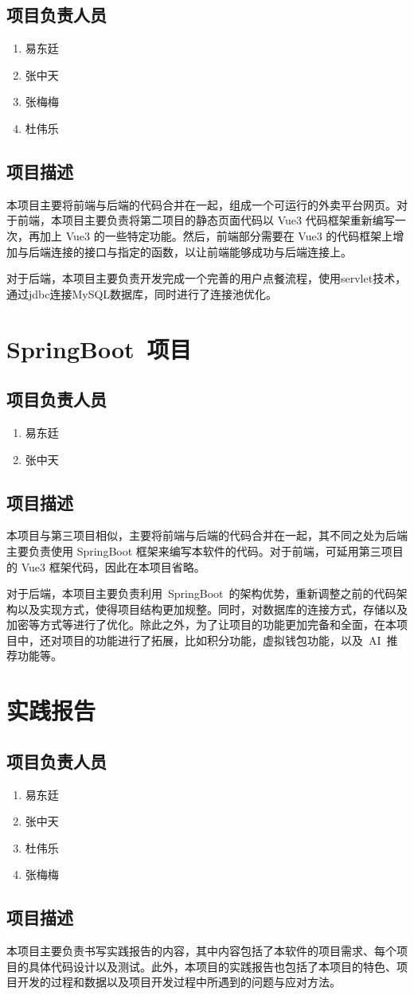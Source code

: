 \subsection{项目负责人员}
\begin{enumerate}
    \item{易东廷}
    \item{张中天}
    \item{张梅梅}
    \item{杜伟乐}
\end{enumerate}
\subsection{项目描述}
本项目主要将前端与后端的代码合并在一起，组成一个可运行的外卖平台网页。对于前端，本项目主要负责将第二项目的静态页面代码以 Vue3 代码框架重新编写一次，再加上 Vue3 的一些特定功能。然后，前端部分需要在 Vue3 的代码框架上增加与后端连接的接口与指定的函数，以让前端能够成功与后端连接上。

对于后端，本项目主要负责开发完成一个完善的用户点餐流程，使用servlet技术，通过jdbc连接MySQL数据库，同时进行了连接池优化。

\section{SpringBoot~项目}
\subsection{项目负责人员}
\begin{enumerate}
    \item{易东廷}
    \item{张中天}
\end{enumerate}
\subsection{项目描述}
本项目与第三项目相似，主要将前端与后端的代码合并在一起，其不同之处为后端主要负责使用 SpringBoot 框架来编写本软件的代码。对于前端，可延用第三项目的 Vue3 框架代码，因此在本项目省略。

对于后端，本项目主要负责利用~SpringBoot~的架构优势，重新调整之前的代码架构以及实现方式，使得项目结构更加规整。同时，对数据库的连接方式，存储以及加密等方式等进行了优化。除此之外，为了让项目的功能更加完备和全面，在本项目中，还对项目的功能进行了拓展，比如积分功能，虚拟钱包功能，以及~AI~推荐功能等。

\section{实践报告}
\subsection{项目负责人员}
\begin{enumerate}
    \item{易东廷}
    \item{张中天}
    \item{杜伟乐}
    \item{张梅梅}
\end{enumerate}
\subsection{项目描述}
本项目主要负责书写实践报告的内容，其中内容包括了本软件的项目需求、每个项目的具体代码设计以及测试。此外，本项目的实践报告也包括了本项目的特色、项目开发的过程和数据以及项目开发过程中所遇到的问题与应对方法。